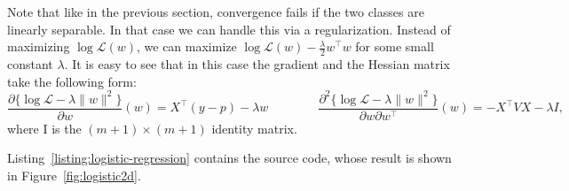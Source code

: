 \documentclass[notitlepage,oneside]{book}
\begin{document}
Note that like in the previous section, convergence fails if the two classes are linearly separable. In that case we can handle this via a regularization.
Instead of maximizing $\log \mathcal{L}(w)$, we can maximize $\log \mathcal{L}(w) - \frac{\lambda}{2} w^\top w$ for some small constant $\lambda$.
It is easy to see that in this case the gradient and the Hessian matrix take the following form:
$$
\frac{\partial\{\log\mathcal L - \lambda \|w\|^2\}}{\partial w}(w) = X^\top (y-p) - \lambda w
\qquad
\qquad
\frac{\partial^2 \{\log \mathcal L - \lambda \|w\|^2\}}{\partial w \partial w^\top}\left(w\right) = -X^\top V X - \lambda I,
$$
where I is the $(m+1)\times (m+1)$ identity matrix.

Listing~\ref{listing:logistic-regression} contains the source code, whose result is shown in Figure~\ref{fig:logistic2d}.
\end{document}
